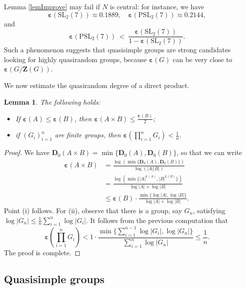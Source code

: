 \documentclass{daj}
\newtheorem{lemma}[theorem]{Lemma}
\theoremstyle{definition}
\theoremstyle{remark}
\newcommand{\PSL}{\mathrm{PSL}}
\newcommand{\SL}{\mathrm{SL}}
\newcommand{\D}{\mathbf{D}}
\newcommand{\Z}{\mathbf{Z}}
\renewcommand{\a}{\boldsymbol{\varepsilon}}
\begin{document}
Lemma \ref{lemImprove} may fail if $N$ is central:
for instance, we have
$$ \a(\SL_2(7)) \approx 0.1889, \quad \a(\PSL_2(7)) \approx 0.2144, $$
and 
$$ \a(\PSL_2(7)) \> < \> \frac{\a(\SL_2(7))}{1-\a(\SL_2(7))} . $$
Such a phenomenon suggests that quasisimple groups are strong candidates looking for highly quasirandom groups,
because $\a(G)$ can be very close to $\a(G/\Z(G))$.

We now estimate the quasirandom degree of a direct product.

\begin{lemma} \label{lemDP}
The following holds:
\begin{itemize}
\item[(i)] If $\a(A) \leq \a(B)$, then $\a(A \times B) \leq \frac{\a(B)}{2}$;

\item[(ii)] if $(G_i)_{i=1}^n$ are finite groups, then $\a\left(\prod_{i=1}^n G_i\right) < \frac{1}{n}$.
\end{itemize}
\end{lemma}
\begin{proof}
We have $\D_0(A \times B) = \min \{ \D_0(A), \D_0(B) \}$,
so that we can write
\[\begin{split}
	\a(A \times B)
	&= \frac{\log \left( \min \{\D_0(A),\D_0(B)\} \right)} {\log(|A||B|)}
	\\&= \frac{\log \left( \min \{|A|^{\a(A)},|B|^{\a(B)}\} \right)} {\log|A|+\log|B|}
	\\&\leq \a(B) \cdot \frac{\min\{\log|A|,\log|B|\}} {\log|A| + \log|B|} .
\end{split} \, \]
Point (i) follows.
For (ii), observe that there is a group, say $G_n$, satisfying $\log |G_n| \leq \frac{1}{n} \sum_{i=1}^n \log |G_i|$.
It follows from the previous computation that
$$ \a\left( \prod_{i=1}^n G_i \right) <
 1\cdot \frac{\min\{\sum_{i=1}^{n-1} \log|G_i|, \log|G_n|\}} {\sum_{i=1}^n \log|G_n|} \leq \frac{1}{n} . $$
 The proof is complete.
\end{proof}


















\subsection{Quasisimple groups} \label{sec:extensions}
\end{document}
